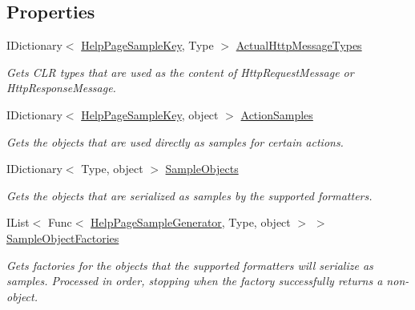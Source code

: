 \subsection*{Properties}
\begin{DoxyCompactItemize}
\item 
I\+Dictionary$<$ \hyperlink{class_w_s1aarsproeve_1_1_areas_1_1_help_page_1_1_help_page_sample_key}{Help\+Page\+Sample\+Key}, Type $>$ \hyperlink{class_w_s1aarsproeve_1_1_areas_1_1_help_page_1_1_help_page_sample_generator_a9a18ba1bfe6a1ba41d8becee665a63b4}{Actual\+Http\+Message\+Types}
\begin{DoxyCompactList}\small\item\em Gets C\+L\+R types that are used as the content of Http\+Request\+Message or Http\+Response\+Message. \end{DoxyCompactList}\item 
I\+Dictionary$<$ \hyperlink{class_w_s1aarsproeve_1_1_areas_1_1_help_page_1_1_help_page_sample_key}{Help\+Page\+Sample\+Key}, object $>$ \hyperlink{class_w_s1aarsproeve_1_1_areas_1_1_help_page_1_1_help_page_sample_generator_a2555dfa02ad5bcbfde218b929232c890}{Action\+Samples}
\begin{DoxyCompactList}\small\item\em Gets the objects that are used directly as samples for certain actions. \end{DoxyCompactList}\item 
I\+Dictionary$<$ Type, object $>$ \hyperlink{class_w_s1aarsproeve_1_1_areas_1_1_help_page_1_1_help_page_sample_generator_a64ab17da769ced26a1908d1e48d5f9d0}{Sample\+Objects}
\begin{DoxyCompactList}\small\item\em Gets the objects that are serialized as samples by the supported formatters. \end{DoxyCompactList}\item 
I\+List$<$ Func$<$ \hyperlink{class_w_s1aarsproeve_1_1_areas_1_1_help_page_1_1_help_page_sample_generator}{Help\+Page\+Sample\+Generator}, Type, object $>$ $>$ \hyperlink{class_w_s1aarsproeve_1_1_areas_1_1_help_page_1_1_help_page_sample_generator_aca3950f9dbe43316aa63aeaaeb1b05b1}{Sample\+Object\+Factories}
\begin{DoxyCompactList}\small\item\em Gets factories for the objects that the supported formatters will serialize as samples. Processed in order, stopping when the factory successfully returns a non-\/ object. \end{DoxyCompactList}\end{DoxyCompactItemize}


